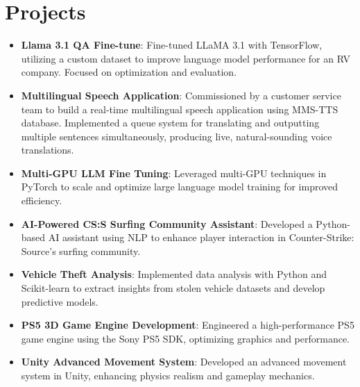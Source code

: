 \documentclass[letterpaper,11pt]{article}
\newcommand{\resumeItem}[2]{
  \item\small{
    \textbf{#1}{: #2 \vspace{-2pt}}
  }
}
\newcommand{\resumeSubItem}[2]{\resumeItem{#1}{#2}\vspace{-4pt}}
\newcommand{\resumeSubHeadingListStart}{\begin{itemize}[leftmargin=*, itemsep=0pt]}
\newcommand{\resumeSubHeadingListEnd}{\end{itemize}}
\begin{document}
\section{Projects}
    \resumeSubHeadingListStart  
      \resumeSubItem{Llama 3.1 QA Fine-tune}
        {Fine-tuned LLaMA 3.1 with TensorFlow, utilizing a custom dataset to improve language model performance for an RV company. Focused on optimization and evaluation.}
      \resumeSubItem{Multilingual Speech Application}
        {Commissioned by a customer service team to build a real-time multilingual speech application using MMS-TTS database. Implemented a queue system for translating and outputting multiple sentences simultaneously, producing live, natural-sounding voice translations.}
      \resumeSubItem{Multi-GPU LLM Fine Tuning}
        {Leveraged multi-GPU techniques in PyTorch to scale and optimize large language model training for improved efficiency.}
      \resumeSubItem{AI-Powered CS:S Surfing Community Assistant}
        {Developed a Python-based AI assistant using NLP to enhance player interaction in Counter-Strike: Source’s surfing community.}
      \resumeSubItem{Vehicle Theft Analysis}
        {Implemented data analysis with Python and Scikit-learn to extract insights from stolen vehicle datasets and develop predictive models.}
      \resumeSubItem{PS5 3D Game Engine Development}
        {Engineered a high-performance PS5 game engine using the Sony PS5 SDK, optimizing graphics and performance.}
      \resumeSubItem{Unity Advanced Movement System}
        {Developed an advanced movement system in Unity, enhancing physics realism and gameplay mechanics.}
    \resumeSubHeadingListEnd
\end{document}

